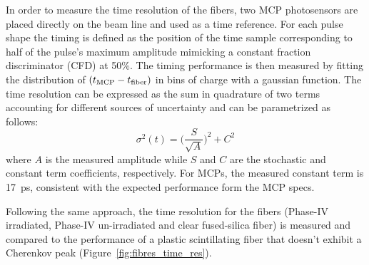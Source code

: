 \documentclass[a4paper,11pt]{article}
\begin{document}
In order to measure the time resolution of the fibers, two MCP photosensors are placed directly on the beam line and used as a time reference. For each pulse shape the timing is defined as the position of the time sample corresponding to half of the pulse's maximum amplitude mimicking a constant fraction discriminator (CFD) at 50\%. The timing performance is then measured by fitting the distribution of $(t_{\rm MCP} - t_{\rm fiber})$ in bins of charge with a gaussian function.  The time resolution can be expressed as the sum in quadrature of two terms accounting for different sources of uncertainty and can be parametrized as follows:
\begin{equation}
    \sigma^2(t) = \bigg( \frac{S}{\sqrt{A}} \bigg)^2 + C^2
\end{equation}
where $A$ is the measured amplitude while $S$ and $C$ are the stochastic and constant term coefficients, respectively. For MCPs, the measured constant term is 17~ps, consistent with the expected performance form the MCP specs.

Following the same approach, the time resolution for the fibers (Phase-IV irradiated, Phase-IV un-irradiated and clear fused-silica fiber) is measured and compared to the performance of a plastic scintillating fiber that doesn't exhibit a Cherenkov peak (Figure~\ref{fig:fibres_time_res}).
\end{document}
